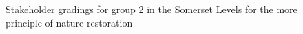 \documentclass[
  12pt,
  letterpaper,
  DIV=11,
  numbers=noendperiod]{scrartcl}
\begin{document}
\begin{figure}[H]


\caption{\label{fig-SomMoreG2}Stakeholder gradings for group 2 in the
Somerset Levels for the more principle of nature restoration}

\end{figure}%
\end{document}
